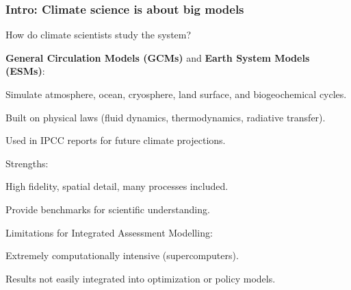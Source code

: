 \documentclass[xcolor=x11names,compress,aspectratio=169]{beamer}%
\makeatletter
\renewenvironment{itemize}{\begin{compactitemize}[<+-| alert@+>]}{\end{compactitemize}}
\makeatother
\begin{document}
\begin{frame}%
%

\frametitle{Intro: Climate science is about big models}%


How do climate scientists study the system?

\begin{itemize}
\item \textbf{General Circulation Models (GCMs)} and \textbf{Earth System
Models (ESMs)}:

\begin{itemize}
\item Simulate atmosphere, ocean, cryosphere, land surface, and biogeochemical cycles.

\item Built on physical laws (fluid dynamics, thermodynamics, radiative transfer).

\item Used in IPCC reports for future climate projections.
\end{itemize}

\item Strengths:

\begin{itemize}
\item High fidelity, spatial detail, many processes included.

\item Provide benchmarks for scientific understanding.
\end{itemize}

\item Limitations for Integrated Assessment Modelling:

\begin{itemize}
\item Extremely computationally intensive (supercomputers).

\item Results not easily integrated into optimization or policy models.
\end{itemize}
\end{itemize}

%

\transboxout
\end{frame}%
%
\end{document}
